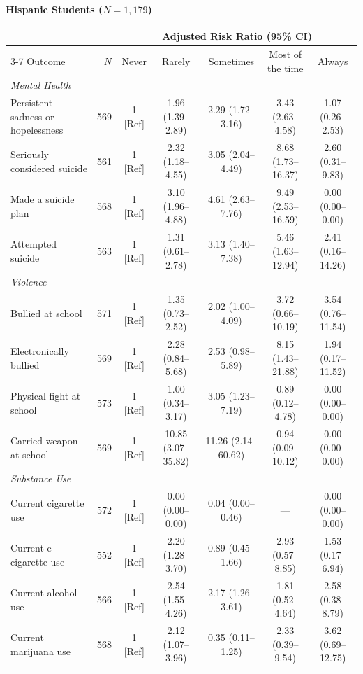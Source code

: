 \documentclass[12pt]{article}
\begin{document}
\begin{landscape}
\nobreak\noindent\textbf{Hispanic Students ($N = 1,179$)}
\nopagebreak\par\nopagebreak\vspace{1pt}\nopagebreak
\nobreak\noindent\begin{tabular}{l r ccccc}
\toprule
 & & \multicolumn{5}{c}{Adjusted Risk Ratio (95\% CI)} \\
\cmidrule(lr){3-7}
Outcome & $N$ & Never & Rarely & Sometimes & Most of the time & Always \\
\midrule
\textit{Mental Health} \\
\quad Persistent sadness or hopelessness & 569 & 1 [Ref] & 1.96 (1.39--2.89) & 2.29 (1.72--3.16) & 3.43 (2.63--4.58) & 1.07 (0.26--2.53) \\
\quad Seriously considered suicide & 561 & 1 [Ref] & 2.32 (1.18--4.55) & 3.05 (2.04--4.49) & 8.68 (1.73--16.37) & 2.60 (0.31--9.83) \\
\quad Made a suicide plan & 568 & 1 [Ref] & 3.10 (1.96--4.88) & 4.61 (2.63--7.76) & 9.49 (2.53--16.59) & 0.00 (0.00--0.00) \\
\quad Attempted suicide & 563 & 1 [Ref] & 1.31 (0.61--2.78) & 3.13 (1.40--7.38) & 5.46 (1.63--12.94) & 2.41 (0.16--14.26) \\
\addlinespace[4pt]
\textit{Violence} \\
\quad Bullied at school & 571 & 1 [Ref] & 1.35 (0.73--2.52) & 2.02 (1.00--4.09) & 3.72 (0.66--10.19) & 3.54 (0.76--11.54) \\
\quad Electronically bullied & 569 & 1 [Ref] & 2.28 (0.84--5.68) & 2.53 (0.98--5.89) & 8.15 (1.43--21.88) & 1.94 (0.17--11.52) \\
\quad Physical fight at school & 573 & 1 [Ref] & 1.00 (0.34--3.17) & 3.05 (1.23--7.19) & 0.89 (0.12--4.78) & 0.00 (0.00--0.00) \\
\quad Carried weapon at school & 569 & 1 [Ref] & 10.85 (3.07--35.82) & 11.26 (2.14--60.62) & 0.94 (0.09--10.12) & 0.00 (0.00--0.00) \\
\addlinespace[4pt]
\textit{Substance Use} \\
\quad Current cigarette use & 572 & 1 [Ref] & 0.00 (0.00--0.00) & 0.04 (0.00--0.46) & --- & 0.00 (0.00--0.00) \\
\quad Current e-cigarette use & 552 & 1 [Ref] & 2.20 (1.28--3.70) & 0.89 (0.45--1.66) & 2.93 (0.57--8.85) & 1.53 (0.17--6.94) \\
\quad Current alcohol use & 566 & 1 [Ref] & 2.54 (1.55--4.26) & 2.17 (1.26--3.61) & 1.81 (0.52--4.64) & 2.58 (0.38--8.79) \\
\quad Current marijuana use & 568 & 1 [Ref] & 2.12 (1.07--3.96) & 0.35 (0.11--1.25) & 2.33 (0.39--9.54) & 3.62 (0.69--12.75) \\
\bottomrule
\end{tabular}\par\vspace{8pt}


\end{landscape}
\end{document}
